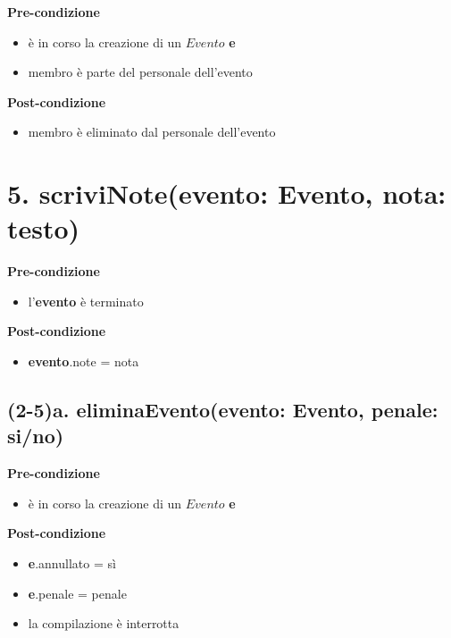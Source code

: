 \documentclass[12pt]{extarticle}
\begin{document}
\textbf{Pre-condizione}
\begin{itemize}
  \item è in corso la creazione di un $Evento$ \textbf{e}
  \item membro è parte del personale dell'evento
\end{itemize}
\textbf{Post-condizione}
\begin{itemize}
  \item membro è eliminato dal personale dell'evento
\end{itemize}


\section*{5. scriviNote(evento: Evento, nota: testo)}

\textbf{Pre-condizione}
\begin{itemize}
  \item l'\textbf{evento} è terminato
\end{itemize}
\textbf{Post-condizione}
\begin{itemize}
  \item \textbf{evento}.note = nota
\end{itemize}


\subsection*{(2-5)a. eliminaEvento(evento: Evento, penale: si/no)}

\textbf{Pre-condizione}
\begin{itemize}
  \item è in corso la creazione di un $Evento$ \textbf{e}
\end{itemize}
\textbf{Post-condizione}
\begin{itemize}
  \item \textbf{e}.annullato = sì
  \item \textbf{e}.penale = penale
  \item la compilazione è interrotta
\end{itemize}  
\end{document}
